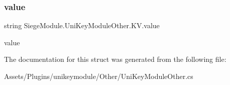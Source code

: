 \subsubsection{\texorpdfstring{value}{value}}
{\footnotesize\ttfamily string Siege\+Module.\+Uni\+Key\+Module\+Other.\+K\+V.\+value}



value 



The documentation for this struct was generated from the following file\+:\begin{DoxyCompactItemize}
\item 
Assets/\+Plugins/unikeymodule/\+Other/Uni\+Key\+Module\+Other.\+cs\end{DoxyCompactItemize}
